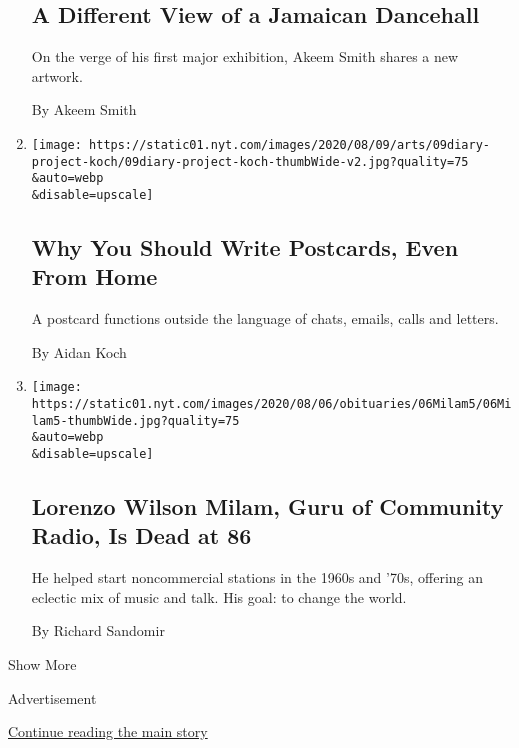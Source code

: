\begin{enumerate}
  \hypertarget{a-different-view-of-a-jamaican-dancehall}{%
  \subsection{A Different View of a Jamaican
  Dancehall}\label{a-different-view-of-a-jamaican-dancehall}}

  On the verge of his first major exhibition, Akeem Smith shares a new
  artwork.

  By Akeem Smith
\item
  \href{/2020/08/07/arts/aidan-koch-postcards.html}{}

  \texttt{[image: https://static01.nyt.com/images/2020/08/09/arts/09diary-project-koch/09diary-project-koch-thumbWide-v2.jpg?quality=75\\\&auto=webp\\\&disable=upscale]}

  \hypertarget{why-you-should-write-postcards-even-from-home}{%
  \subsection{Why You Should Write Postcards, Even From
  Home}\label{why-you-should-write-postcards-even-from-home}}

  A postcard functions outside the language of chats, emails, calls and
  letters.

  By Aidan Koch
\item
  \href{/2020/08/07/business/media/lorenzo-milam-dead.html}{}

  \texttt{[image: https://static01.nyt.com/images/2020/08/06/obituaries/06Milam5/06Milam5-thumbWide.jpg?quality=75\\\&auto=webp\\\&disable=upscale]}

  \hypertarget{lorenzo-wilson-milam-guru-of-community-radio-is-dead-at-86}{%
  \subsection{Lorenzo Wilson Milam, Guru of Community Radio, Is Dead at
  86}\label{lorenzo-wilson-milam-guru-of-community-radio-is-dead-at-86}}

  He helped start noncommercial stations in the 1960s and '70s, offering
  an eclectic mix of music and talk. His goal: to change the world.

  By Richard Sandomir
\end{enumerate}

Show More

Advertisement

\protect\hyperlink{after-mid2}{Continue reading the main story}

